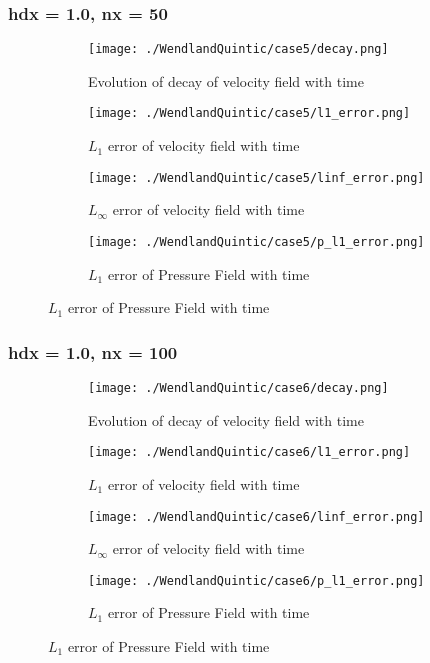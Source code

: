 \documentclass[11pt, a4paper]{article}
\begin{document}
\subsubsection{hdx = 1.0, nx = 50}
\begin{figure}[H]
\begin{subfigure}{0.48\textwidth}
\texttt{[image: ./WendlandQuintic/case5/decay.png]}
\caption{Evolution of decay of velocity field with time}
\end{subfigure}
\begin{subfigure}{0.48\textwidth}
\texttt{[image: ./WendlandQuintic/case5/l1\_error.png]}
\caption{$L_1$ error of velocity field with time}
\end{subfigure}
\medskip
\begin{subfigure}{0.48\textwidth}
\texttt{[image: ./WendlandQuintic/case5/linf\_error.png]}
\caption{$L_\infty$ error of velocity field with time}
\end{subfigure}
\begin{subfigure}{0.48\textwidth}
\texttt{[image: ./WendlandQuintic/case5/p\_l1\_error.png]}
\caption{$L_1$ error of Pressure Field with time}
\end{subfigure}
\end{figure}

\subsubsection{hdx = 1.0, nx = 100}
\begin{figure}[H]
\begin{subfigure}{0.48\textwidth}
\texttt{[image: ./WendlandQuintic/case6/decay.png]}
\caption{Evolution of decay of velocity field with time}
\end{subfigure}
\begin{subfigure}{0.48\textwidth}
\texttt{[image: ./WendlandQuintic/case6/l1\_error.png]}
\caption{$L_1$ error of velocity field with time}
\end{subfigure}
\medskip
\begin{subfigure}{0.48\textwidth}
\texttt{[image: ./WendlandQuintic/case6/linf\_error.png]}
\caption{$L_\infty$ error of velocity field with time}
\end{subfigure}
\begin{subfigure}{0.48\textwidth}
\texttt{[image: ./WendlandQuintic/case6/p\_l1\_error.png]}
\caption{$L_1$ error of Pressure Field with time}
\end{subfigure}
\end{figure}
\end{document}
